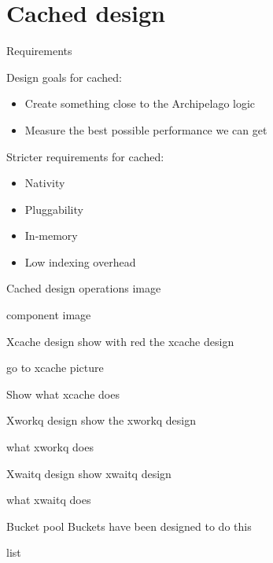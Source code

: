 \section{Cached design}

\begin{frame}{Requirements}

	Design goals for cached:
	\begin{itemize}
		\item Create something close to the Archipelago logic
		\item Measure the best possible performance we can get
	\end{itemize}
	\dspc
	Stricter requirements for cached:
	\begin{itemize}
		\item Nativity
		\item Pluggability
		\item In-memory
		\item Low indexing overhead
	\end{itemize}
\end{frame}

\begin{frame}{Cached design}
	operations image

	component image
\end{frame}

\begin{frame}{Xcache design}
	show with red the xcache design

	go to xcache picture

	Show what xcache does
\end{frame}

\begin{frame}{Xworkq design}
	show the xworkq design

	what xworkq does
\end{frame}

\begin{frame}{Xwaitq design}
	show xwaitq design

	what xwaitq does
\end{frame}

\begin{frame}{Bucket pool}
	Buckets have been designed to do this	

	list
\end{frame}


